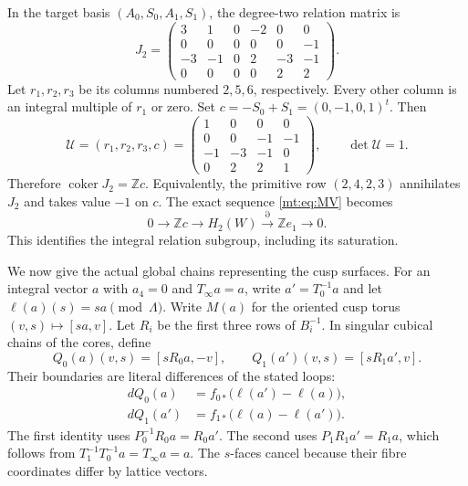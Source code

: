In the target basis $(A_0,S_0,A_1,S_1)$, the degree-two relation matrix is
\begin{equation}\label{mt:eq:J2}
J_2=\begin{pmatrix}
3&1&0&-2&0&0\\
0&0&0&0&0&-1\\
-3&-1&0&2&-3&-1\\
0&0&0&0&2&2
\end{pmatrix}.
\end{equation}
Let $r_1,r_2,r_3$ be its columns numbered $2,5,6$, respectively.
Every other column is an integral multiple of $r_1$ or zero.
Set $c=-S_0+S_1=(0,-1,0,1)^t$.
Then
\begin{equation}\label{mt:eq:unimodular}
\mathcal U=(r_1,r_2,r_3,c)
=\begin{pmatrix}1&0&0&0\\0&0&-1&-1\\-1&-3&-1&0\\0&2&2&1\end{pmatrix},
\qquad \det\mathcal U=1.
\end{equation}
Therefore $\operatorname{coker}J_2=\mathbb Zc$.
Equivalently, the primitive row $(2,4,2,3)$ annihilates $J_2$
and takes value $-1$ on $c$.
The exact sequence \eqref{mt:eq:MV} becomes
\begin{equation}\label{mt:eq:extension}
0\longrightarrow\mathbb Zc\longrightarrow H_2(W)
\xrightarrow{\partial}\mathbb Ze_1\longrightarrow0.
\end{equation}
This identifies the integral relation subgroup, including its saturation.

We now give the actual global chains representing the cusp surfaces.
For an integral vector $a$ with $a_4=0$ and $T_\infty a=a$,
write $a'=T_0^{-1}a$ and let $\ell(a)(s)=sa\pmod\Lambda$.
Write $M(a)$ for the oriented cusp torus $(v,s)\mapsto[sa,v]$.
Let $R_i$ be the first three rows of $B_i^{-1}$.
In singular cubical chains of the cores, define
\begin{equation}\label{mt:eq:Q}
Q_0(a)(v,s)=[sR_0a,-v],\qquad
Q_1(a')(v,s)=[sR_1a',v].
\end{equation}
Their boundaries are literal differences of the stated loops:
\begin{equation}\label{mt:eq:boundaries}
\begin{aligned}
dQ_0(a)&=f_{0*}\bigl(\ell(a')-\ell(a)\bigr),\\
dQ_1(a')&=f_{1*}\bigl(\ell(a)-\ell(a')\bigr).
\end{aligned}
\end{equation}
The first identity uses $P_0^{-1}R_0a=R_0a'$.
The second uses $P_1R_1a'=R_1a$,
which follows from $T_1^{-1}T_0^{-1}a=T_\infty a=a$.
The $s$-faces cancel because their fibre coordinates differ by lattice vectors.


